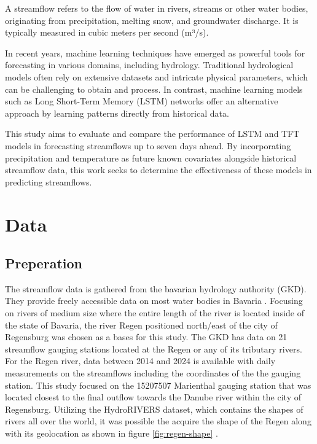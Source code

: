 \documentclass[
]{krantz}
\begin{document}
A streamflow refers to the flow of water in rivers, streams or other water bodies, originating from precipitation, melting snow, and groundwater discharge. It is typically measured in cubic meters per second (m³/s).

In recent years, machine learning techniques have emerged as powerful tools for forecasting in various domains, including hydrology. Traditional hydrological models often rely on extensive datasets and intricate physical parameters, which can be challenging to obtain and process. In contrast, machine learning models such as Long Short-Term Memory (LSTM) networks offer an alternative approach by learning patterns directly from historical data.

This study aims to evaluate and compare the performance of LSTM and TFT models in forecasting streamflows up to seven days ahead. By incorporating precipitation and temperature as future known covariates alongside historical streamflow data, this work seeks to determine the effectiveness of these models in predicting streamflows.

\section{Data}\label{data-2}

\subsection{Preperation}\label{preperation}

The streamflow data is gathered from the bavarian hydrology authority (GKD). They provide freely accessible data on most water bodies in Bavaria \citet{bayerisches_landesamt}. Focusing on rivers of medium size where the entire length of the river is located inside of the state of Bavaria, the river Regen positioned north/east of the city of Regensburg was chosen as a bases for this study. The GKD has data on 21 streamflow gauging stations located at the Regen or any of its tributary rivers. For the Regen river, data between 2014 and 2024 is available with daily measurements on the streamflows including the coordinates of the the gauging station. This study focused on the 15207507 Marienthal gauging station that was located closest to the final outflow towards the Danube river within the city of Regensburg. Utilizing the HydroRIVERS dataset, which contains the shapes of rivers all over the world, it was possible the acquire the shape of the Regen along with its geolocation as shown in figure \ref{fig:regen-shape} \citet{lehner}.
\end{document}
